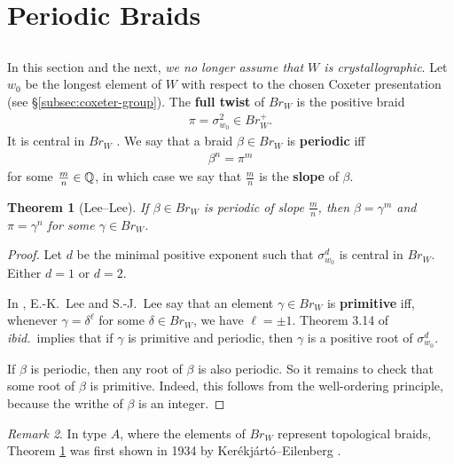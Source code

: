 \documentclass[a4paper,10pt,leqno]{amsart}
\theoremstyle{plain}
\theoremstyle{plain}
\newtheorem{thm}{Theorem}[subsection]
\theoremstyle{plain}
\theoremstyle{definition}
\theoremstyle{remark}
\newtheorem{rem}[thm]{Remark}
\newcommand{\dfemph}[1]{\textbf{#1}}
\newcommand{\Br}{\mathit{Br}}
\begin{document}
\newpage
\section{Periodic Braids}\label{sec:periodic}

\subsection{}

In this section and the next, \emph{we no longer assume that $W$ is crystallographic}.
Let $w_0$ be the longest element of $W$ with respect to the chosen Coxeter presentation (see \S\ref{subsec:coxeter-group}).
The \dfemph{full twist} of $\Br_W$ is the positive braid
\begin{align}
\pi = \sigma_{w_0}^2 \in \Br_W^+.
\end{align}
It is central in $\Br_W$ \cite[\S{2}]{bm_1997}.
We say that a braid $\beta \in \Br_W$ is \dfemph{periodic} iff 
\begin{align}
\beta^n = \pi^m
\end{align}
for some $\frac{m}{n} \in \mathbb{Q}$, in which case we say that $\frac{m}{n}$ is the \dfemph{slope} of $\beta$.

\begin{thm}[Lee--Lee]\label{thm:ll}
If $\beta \in \Br_W$ is periodic of slope $\frac{m}{n}$, then $\beta = \gamma^m$ and $\pi = \gamma^n$ for some $\gamma \in \Br_W$.
\end{thm}

\begin{proof}
Let $d$ be the minimal positive exponent such that $\sigma_{w_0}^d$ is central in $\Br_W$.
Either $d = 1$ or $d = 2$.

In \cite{ll}, E.-K.\ Lee and S.-J.\ Lee say that an element $\gamma \in \Br_W$ is \dfemph{primitive} iff, whenever $\gamma = \delta^\ell$ for some $\delta \in \Br_W$, we have $\ell = \pm 1$.
Theorem 3.14 of \emph{ibid.}\ implies that if $\gamma$ is primitive and periodic, then $\gamma$ is a positive root of $\sigma_{w_0}^d$.

If $\beta$ is periodic, then any root of $\beta$ is also periodic.
So it remains to check that some root of $\beta$ is primitive.
Indeed, this follows from the well-ordering principle, because the writhe of $\beta$ is an integer.
\end{proof}

\begin{rem}
In type $A$, where the elements of $\Br_W$ represent topological braids, Theorem \ref{thm:ll} was first shown in 1934 by Ker\'ekj\'art\'o--Eilenberg \cite{eilenberg}.
\end{rem}
\end{document}
